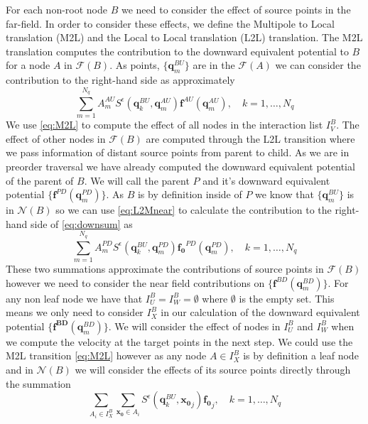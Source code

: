 For each non-root node $B$ we need to consider the effect of source points in the far-field. In order to consider these effects, we define the Multipole to Local translation (M2L) and the Local to Local translation (L2L) translation. The M2L translation computes the contribution to the downward equivalent potential to $B$ for a node $A$ in $\mathcal{F}(B)$. As points, $\{\mathbf{q}^{BU}_m\}$ are in the $\mathcal{F}(A)$ we can consider the contribution to the right-hand side as approximately 
\begin{equation}
\label{eq:M2L}
\sum_{m=1}^{N_{q}} A_{m}^{A U} S^\epsilon\left(\mathbf{q}_{k}^{B U}, \mathbf{q}_{m}^{A U}\right) \mathbf{f}^{A U}\left(\mathbf{q}_{m}^{A U}\right), \quad k=1,\dots,N_q
\end{equation}
We use \cref{eq:M2L} to compute the effect of all nodes in the interaction list $I_V^B$. The effect of other nodes in $\mathcal{F}(B)$ are computed through the L2L transition where we pass information of distant source points from parent to child. As we are in preorder traversal we have already computed the downward equivalent potential of the parent of $B$. We will call the parent $P$ and it's downward equivalent potential $\{\mathbf{f}^{PD}(\mathbf{q}^{PD}_m)\}$. As $B$ is by definition inside of $P$ we know that $\{\mathbf{q}^{BU}_m\}$ is in $\mathcal{N}(B)$ so we can use \cref{eq:L2Mnear} to calculate the contribution to the right-hand side of \cref{eq:downsum} as
\begin{equation}
\label{eq:L2L}
\sum_{m=1}^{N_{q}} A_{m}^{P D} S^\epsilon\left(\mathbf{q}_{k}^{B U}, \mathbf{q}_{m}^{P D}\right) \mathbf{f_0}^{P D}\left(\mathbf{q}_{m}^{P D}\right), \quad k=1,\dots,N_q
\end{equation}
These two summations approximate the contributions of source points in $\mathcal{F}(B)$ however we need to consider the near field contributions on $\{\mathbf{f}^{B D}(\mathbf{q}^{BD}_m)\}$. For any non leaf node we have that $I_U^B = I_W^B = \emptyset$ where $\emptyset$ is the empty set. This means we only need to consider $I_X^B$ in our calculation of the downward equivalent potential $\{\mathbf{f^{BD}}(\mathbf{q}^{BD}_m)\}$. We will consider the effect of nodes in $I_U^B$ and $I_W^B$ when we compute the velocity at the target points in the next step. We could use the M2L transition \cref{eq:M2L} however as any node $A \in I_X^B$ is by definition a leaf node and in $\mathcal{N}(B)$ we will consider the effects of its source points directly through the summation
\begin{equation}
\label{eq:X}
    \sum_{A_i \in I_X^B} \sum_{\mathbf{x_0}\in A_i} S^\epsilon\left(\mathbf{q}^{BU}_{k}, \mathbf{x_0}_{j}\right) \mathbf{f_0}_{j}, \quad k=1,\dots,N_q
\end{equation}

